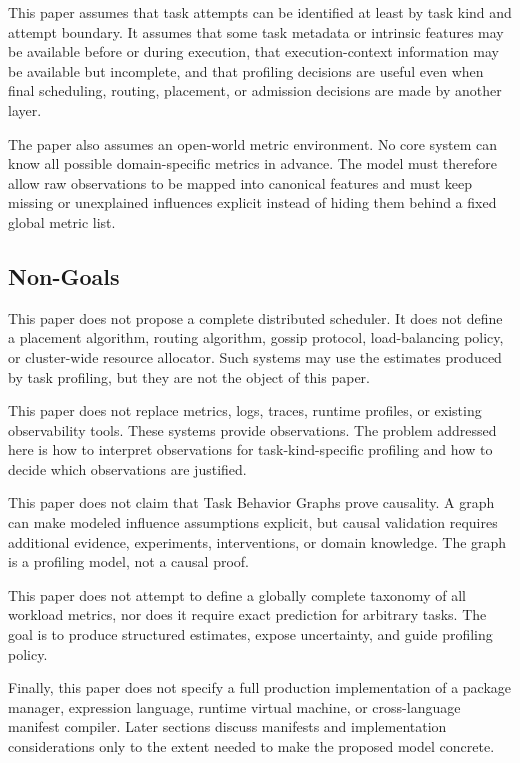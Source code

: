 This paper assumes that task attempts can be identified at least by task kind
and attempt boundary. It assumes that some task metadata or intrinsic features
may be available before or during execution, that execution-context information
may be available but incomplete, and that profiling decisions are useful even
when final scheduling, routing, placement, or admission decisions are made by
another layer.

The paper also assumes an open-world metric environment. No core system can know
all possible domain-specific metrics in advance. The model must therefore allow
raw observations to be mapped into canonical features and must keep missing or
unexplained influences explicit instead of hiding them behind a fixed global
metric list.

\subsection{Non-Goals}
\label{sec:problem-non-goals}

This paper does not propose a complete distributed scheduler. It does not define
a placement algorithm, routing algorithm, gossip protocol, load-balancing policy,
or cluster-wide resource allocator. Such systems may use the estimates produced
by task profiling, but they are not the object of this paper.

This paper does not replace metrics, logs, traces, runtime profiles, or existing
observability tools. These systems provide observations. The problem addressed
here is how to interpret observations for task-kind-specific profiling and how
to decide which observations are justified.

This paper does not claim that Task Behavior Graphs prove causality. A graph can
make modeled influence assumptions explicit, but causal validation requires
additional evidence, experiments, interventions, or domain knowledge. The graph
is a profiling model, not a causal proof.

This paper does not attempt to define a globally complete taxonomy of all
workload metrics, nor does it require exact prediction for arbitrary tasks. The
goal is to produce structured estimates, expose uncertainty, and guide profiling
policy.

Finally, this paper does not specify a full production implementation of a
package manager, expression language, runtime virtual machine, or cross-language
manifest compiler. Later sections discuss manifests and implementation
considerations only to the extent needed to make the proposed model concrete.
